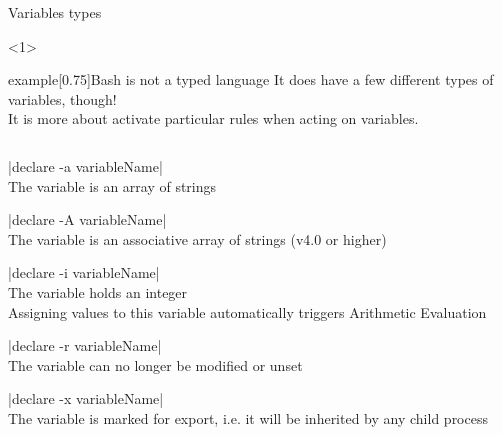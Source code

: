 \begin{frame}[fragile]{Variables types}
    \begin{onlyenv}<1>
        \vspace{-5mm}
        \begin{varblock}{example}[0.75\textwidth]{Bash is not a typed language}
            It does have a few different types of variables, though! \\
            It is more about activate particular rules when acting on variables.
        \end{varblock}
        \vspace{-5mm}
        \begin{columns}
            \begin{column}{\dimexpr\paperwidth-10mm}
                \begin{description}
                    \setlength{\itemsep}{1mm}
                    \item[\textbf{Array:}]
                        \bash|declare -a variableName|\\
                        The variable is an array of strings
                    \item[\textbf{Associative array:}]
                        \bash|declare -A variableName|\\
                        The variable is an associative array of strings (v4.0 or higher)
                    \item[\textbf{Integer:}]
                        \bash|declare -i variableName|\\
                        The variable holds an integer\\
                        Assigning values to this variable automatically triggers Arithmetic Evaluation
                    \item[\textbf{Read only:}]
                        \bash|declare -r variableName|\\
                        The variable can no longer be modified or unset
                    \item[\textbf{Export:}]
                        \bash|declare -x variableName|\\
                        The variable is marked for export, i.e. it will be inherited by any child process
                \end{description}
            \end{column}
        \end{columns}
    \end{onlyenv}

\end{frame}
